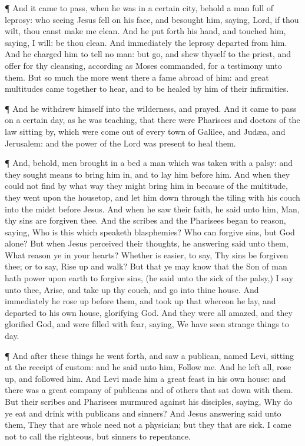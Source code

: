  ¶ And it came to pass, when he was in a certain city,
behold a man full of leprosy: who seeing Jesus fell on his face, and
besought him, saying, Lord, if thou wilt, thou canst make me clean.
 And he put forth his hand, and touched him, saying, I
will: be thou clean. And immediately the leprosy departed from him.
 And he charged him to tell no man: but go, and shew
thyself to the priest, and offer for thy cleansing, according as Moses
commanded, for a testimony unto them.  But so much the more
went there a fame abroad of him: and great multitudes came together to
hear, and to be healed by him of their infirmities.

 ¶ And he withdrew himself into the wilderness, and prayed.
 And it came to pass on a certain day, as he was teaching,
that there were Pharisees and doctors of the law sitting by, which were
come out of every town of Galilee, and Judæa, and Jerusalem: and the
power of the Lord was present to heal them.

 ¶ And, behold, men brought in a bed a man which was taken
with a palsy: and they sought means to bring him in, and to lay him
before him.  And when they could not find by what way they
might bring him in because of the multitude, they went upon the
housetop, and let him down through the tiling with his couch into the
midst before Jesus.  And when he saw their faith, he said
unto him, Man, thy sins are forgiven thee.  And the scribes
and the Pharisees began to reason, saying, Who is this which speaketh
blasphemies? Who can forgive sins, but God alone?  But when
Jesus perceived their thoughts, he answering said unto them, What reason
ye in your hearts?  Whether is easier, to say, Thy sins be
forgiven thee; or to say, Rise up and walk?  But that ye
may know that the Son of man hath power upon earth to forgive sins, (he
said unto the sick of the palsy,) I say unto thee, Arise, and take up
thy couch, and go into thine house.  And immediately he
rose up before them, and took up that whereon he lay, and departed to
his own house, glorifying God.  And they were all amazed,
and they glorified God, and were filled with fear, saying, We have seen
strange things to day.

 ¶ And after these things he went forth, and saw a
publican, named Levi, sitting at the receipt of custom: and he said unto
him, Follow me.  And he left all, rose up, and followed
him.  And Levi made him a great feast in his own house: and
there was a great company of publicans and of others that sat down with
them.  But their scribes and Pharisees murmured against his
disciples, saying, Why do ye eat and drink with publicans and sinners?
 And Jesus answering said unto them, They that are whole
need not a physician; but they that are sick.  I came not
to call the righteous, but sinners to repentance.

